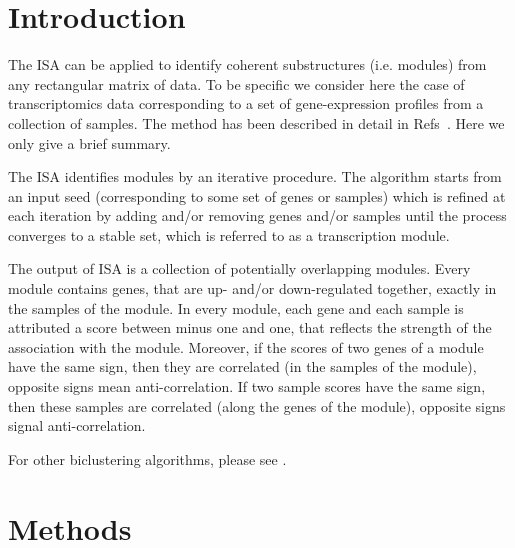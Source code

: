 \documentclass{bioinfo}
\begin{document}
\vspace{-1cm}
\section{Introduction}

The ISA can be applied to identify coherent substructures (i.e. modules)
from any rectangular matrix of data. To be specific we consider here the
case of transcriptomics data corresponding to a set of gene-expression
profiles from a collection of samples. The method has been described in
detail in Refs~\citep{isamod,isa}. Here we only give a brief summary.

The ISA identifies modules by an iterative procedure. The algorithm starts
from an input seed (corresponding to some set of genes or samples) which is
refined at each iteration by adding and/or removing genes and/or samples
until the process converges to a stable set, which is referred to as a
transcription module.

The output of ISA is a collection of potentially overlapping
modules. Every module contains genes, that are up- and/or
down-regulated together, exactly in the samples of the module.
In every module, each gene and each sample is attributed a
score between minus one and one, that reflects the strength of the
association with the module. Moreover, if the scores of two genes of a
module have the same sign, then they are correlated (in the samples of
the module), opposite signs mean anti-correlation. If two sample
scores have the same sign, then these samples are correlated (along
the genes of the module), opposite signs signal anti-correlation.

For other biclustering algorithms, please see
\citet{cheng00,getz00,califano00,sharan02,tanay04,barkow06}.

\section{Methods}%
\label{sec:methods}
\end{document}
